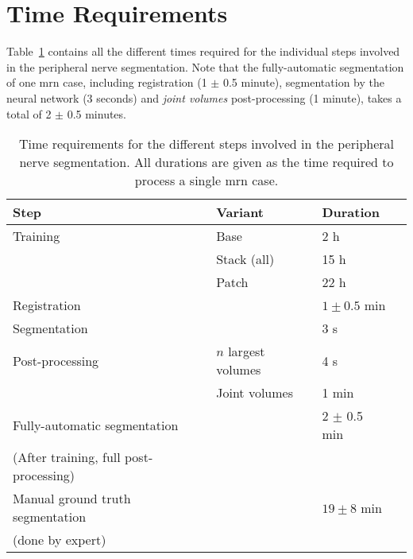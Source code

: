 \section{Time Requirements} \label{sec:res_times}
Table~\ref{tab:results_durations} contains all the different times required for the individual steps involved in the peripheral nerve segmentation. Note that the fully-automatic segmentation of one \gls{mrn} case, including registration (1 $\pm$ 0.5 minute), segmentation by the neural network (3 seconds) and \textit{joint volumes} post-processing (1 minute), takes a total of 2 $\pm$ 0.5 minutes.

\begin{table}[htbp]
   \centering
   \caption[Time Requirements]{Time requirements for the different steps involved in the peripheral nerve segmentation. All durations are given as the time required to process a single \gls{mrn} case.}
   \begin{tabular}{l*{3}{l}}
      \toprule
      Step                  & Variant               & Duration\\
      \midrule
      Training              & Base                  & 2 h   \\
                            & Stack (all)           & 15 h  \\
                            & Patch                 & 22 h  \\
      \midrule
      Registration          &                       & $1 \pm 0.5$ min \\
      \midrule
      Segmentation          &                       & 3 s \\
      Post-processing       & $n$ largest volumes   & 4 s \\
                            & Joint volumes         & 1 min \\
      \midrule
      Fully-automatic segmentation & & 2 $\pm$ 0.5 min\\
      (After training, full post-processing)\\
      \midrule
      Manual ground truth segmentation & & $19 \pm 8$ min\\
      (done by expert) \\
      \bottomrule
   \end{tabular}
   \label{tab:results_durations}
\end{table}

\endinput